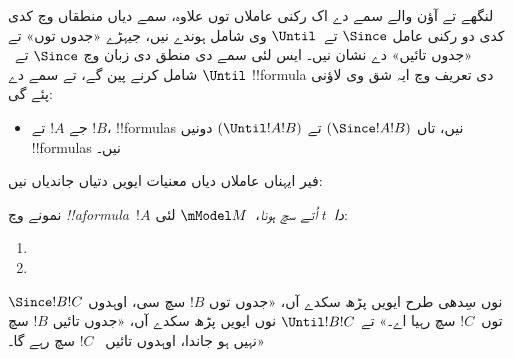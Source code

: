 \documentclass[../../../include/open-logic-section]{subfiles}
\begin{document}


لنگھے تے آؤن والے سمے دے اک رکنی عاملاں توں علاوہ، سمے دیاں منطقاں
وچ کدی کدی دو رکنی عامل $\Since $ تے~$\Until$ وی شامل ہوندے نیں،
جیہڑے «جدوں توں» تے «جدوں تائیں» دے نشان نیں۔ ایس لئی سمے دی منطق
دی زبان وچ $\Since $ تے~$\Until$ شامل کرنے پین گے، تے سمے دے
!!{formula} دی تعریف وچ ایہ شق وی لاؤنی پئے گی:

\begin{itemize}
\item[] جے $!A$ تے $!B$، !!{formula}s نیں، تاں $(\Since  !A !B)$ تے
  $(\Until !A !B)$ دونیں !!{formula}s نیں۔
\end{itemize}

فیر ایہناں عاملاں دیاں معنیات ایویں دتیاں جاندیاں نیں:

\begin{defn}
  نمونے وچ \emph{!!a{formula}~$!A$ دا~$t$ اُتے سچ ہونا}،~$\mModel M$
  لئی:
  \begin{enumerate}
  \item{} 
  \item{} 
  \end{enumerate}
\end{defn}

$\Since  !B !C$ نوں سِدھی طرح ایویں پڑھ سکدے آں، «جدوں توں
$!B$ سچ سی، اوہدوں توں~$!C$ سچ رہیا اے۔» تے $\Until !B !C$ نوں
ایویں پڑھ سکدے آں، «جدوں تائیں $!B$ سچ نہیں ہو جاندا، اوہدوں تائیں
~$!C$ سچ رہے گا۔»
\end{document}
